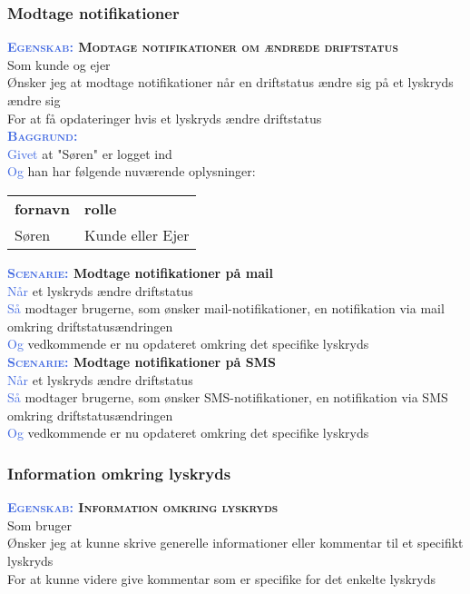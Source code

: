 \subsubsection{Modtage notifikationer}
\textbf{\textsc{\textcolor{RoyalBlue}{Egenskab:} Modtage notifikationer om ændrede driftstatus}}\\
Som kunde og ejer\\
Ønsker jeg at modtage notifikationer når en driftstatus ændre sig på et lyskryds ændre sig\\
For at få opdateringer hvis et lyskryds ændre driftstatus\\

\textsc{\textcolor{RoyalBlue}{\textbf{Baggrund:}}}\\
\textcolor{RoyalBlue}{Givet} at "Søren" er logget ind\\
\textcolor{RoyalBlue}{Og} han har følgende nuværende oplysninger:\\
\begin{tabular}{| l | l |}
	\textbf{fornavn} & \textbf{rolle} \\
	Søren & Kunde eller Ejer\\
\end{tabular}
\newline \newline

\textbf{\textsc{\textcolor{RoyalBlue}{Scenarie:}} Modtage notifikationer på 
	mail}\\
\textcolor{RoyalBlue}{Når} et lyskryds ændre driftstatus\\
\textcolor{RoyalBlue}{Så} modtager brugerne, som ønsker 
mail-notifikationer, en notifikation via mail omkring driftstatusændringen\\
\textcolor{RoyalBlue}{Og} vedkommende er nu opdateret omkring det specifike lyskryds\\

\textbf{\textsc{\textcolor{RoyalBlue}{Scenarie:}} Modtage notifikationer på 
	SMS}\\
\textcolor{RoyalBlue}{Når} et lyskryds ændre driftstatus\\
\textcolor{RoyalBlue}{Så} modtager brugerne, som ønsker SMS-notifikationer, 
en notifikation via SMS omkring driftstatusændringen\\
\textcolor{RoyalBlue}{Og} vedkommende er nu opdateret omkring det specifike 
lyskryds\\

\subsubsection{Information omkring lyskryds}
\textbf{\textsc{\textcolor{RoyalBlue}{Egenskab:} Information omkring lyskryds}}\\
Som bruger\\
Ønsker jeg at kunne skrive generelle informationer eller kommentar til et specifikt lyskryds\\
For at kunne videre give kommentar som er specifike for det enkelte lyskryds\\

